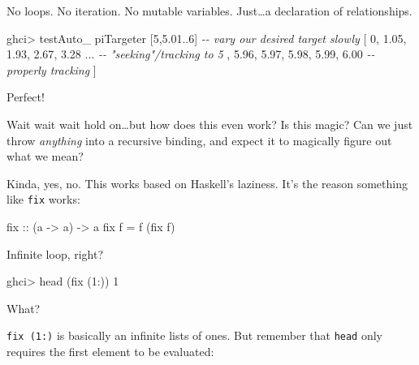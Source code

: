\documentclass[]{article}
\newenvironment{Shaded}{}{}
\newcommand{\CommentTok}[1]{\textcolor[rgb]{0.38,0.63,0.69}{\textit{#1}}}
\newcommand{\DecValTok}[1]{\textcolor[rgb]{0.25,0.63,0.44}{#1}}
\newcommand{\FloatTok}[1]{\textcolor[rgb]{0.25,0.63,0.44}{#1}}
\newcommand{\FunctionTok}[1]{\textcolor[rgb]{0.02,0.16,0.49}{#1}}
\newcommand{\NormalTok}[1]{#1}
\newcommand{\OperatorTok}[1]{\textcolor[rgb]{0.40,0.40,0.40}{#1}}
\newcommand{\OtherTok}[1]{\textcolor[rgb]{0.00,0.44,0.13}{#1}}
\begin{document}
No loops. No iteration. No mutable variables. Just\ldots a declaration of
relationships.

\begin{Shaded}
\begin{Highlighting}[]
\NormalTok{ghci}\OperatorTok{\textgreater{}}\NormalTok{ testAuto\_ piTargeter [}\DecValTok{5}\NormalTok{,}\FloatTok{5.01}\OperatorTok{..}\DecValTok{6}\NormalTok{]      }\CommentTok{{-}{-} vary our desired target slowly}
\NormalTok{[ }\DecValTok{0}\NormalTok{, }\FloatTok{1.05}\NormalTok{, }\FloatTok{1.93}\NormalTok{, }\FloatTok{2.67}\NormalTok{, }\FloatTok{3.28} \OperatorTok{...}         \CommentTok{{-}{-} "seeking"/tracking to 5}
\NormalTok{, }\FloatTok{5.96}\NormalTok{, }\FloatTok{5.97}\NormalTok{, }\FloatTok{5.98}\NormalTok{, }\FloatTok{5.99}\NormalTok{, }\FloatTok{6.00}          \CommentTok{{-}{-} properly tracking}
\NormalTok{]}
\end{Highlighting}
\end{Shaded}

Perfect!

Wait wait wait hold on\ldots but how does this even work? Is this magic? Can we
just throw \emph{anything} into a recursive binding, and expect it to magically
figure out what we mean?

Kinda, yes, no. This works based on Haskell's laziness. It's the reason
something like \texttt{fix} works:

\begin{Shaded}
\begin{Highlighting}[]
\OtherTok{fix ::}\NormalTok{ (a }\OtherTok{{-}\textgreater{}}\NormalTok{ a) }\OtherTok{{-}\textgreater{}}\NormalTok{ a}
\NormalTok{fix f }\OtherTok{=}\NormalTok{ f (fix f)}
\end{Highlighting}
\end{Shaded}

Infinite loop, right?

\begin{Shaded}
\begin{Highlighting}[]
\NormalTok{ghci}\OperatorTok{\textgreater{}} \FunctionTok{head}\NormalTok{ (fix (}\DecValTok{1}\OperatorTok{:}\NormalTok{))}
\DecValTok{1}
\end{Highlighting}
\end{Shaded}

What?

\texttt{fix\ (1:)} is basically an infinite lists of ones. But remember that
\texttt{head} only requires the first element to be evaluated:
\end{document}
